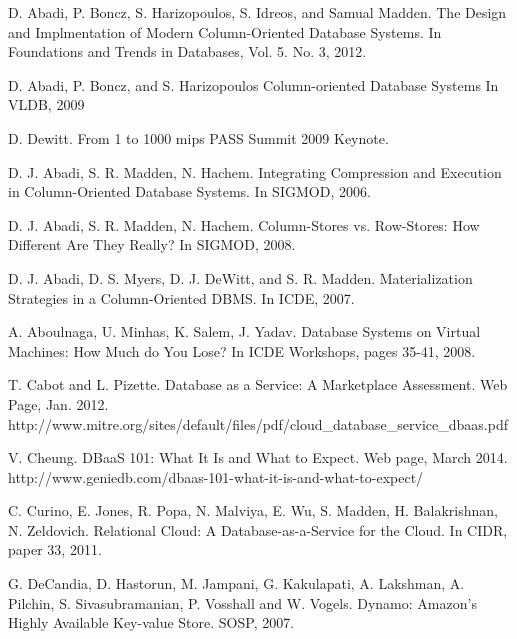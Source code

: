 
\begin{thebibliography}{1}






D. Abadi, P. Boncz, S. Harizopoulos, S. Idreos, and Samual Madden.
The Design and Implmentation of Modern Column-Oriented Database Systems.
In Foundations and Trends in Databases, Vol. 5. No. 3, 2012.


D. Abadi, P. Boncz, and S. Harizopoulos
Column-oriented Database Systems
In VLDB, 2009


D. Dewitt.
From 1 to 1000 mips
PASS Summit 2009 Keynote.


D. J. Abadi, S. R. Madden, N. Hachem.
Integrating Compression and Execution in Column-Oriented Database Systems.
In SIGMOD, 2006.


D. J. Abadi, S. R. Madden, N. Hachem.
Column-Stores vs. Row-Stores: How Different Are They Really?
In SIGMOD, 2008.


D. J. Abadi, D. S. Myers, D. J. DeWitt, and S. R. Madden.
Materialization Strategies in a Column-Oriented DBMS.
In ICDE, 2007.


A. Aboulnaga, U. Minhas, K. Salem, J. Yadav.
Database Systems on Virtual Machines: How Much do You Lose? 
In ICDE Workshops, pages 35-41, 2008.


T. Cabot and L. Pizette.
Database as a Service: A Marketplace Assessment.
Web Page, Jan. 2012.
http://www.mitre.org/sites/default/files/pdf/cloud\_database\_service\_dbaas.pdf


V. Cheung.
DBaaS 101: What It Is and What to Expect.
Web page, March 2014.
http://www.geniedb.com/dbaas-101-what-it-is-and-what-to-expect/


C. Curino, E. Jones, R. Popa, N. Malviya, E. Wu, S. Madden, H. Balakrishnan, N. Zeldovich.
Relational Cloud: A Database-as-a-Service for the Cloud.
In CIDR, paper 33, 2011.


G. DeCandia, D. Hastorun, M. Jampani, G. Kakulapati, A. Lakshman, A. Pilchin, S. Sivasubramanian, P. Vosshall and W. Vogels.
Dynamo: Amazon's Highly Available Key-value Store.
SOSP, 2007.



\end{thebibliography}
